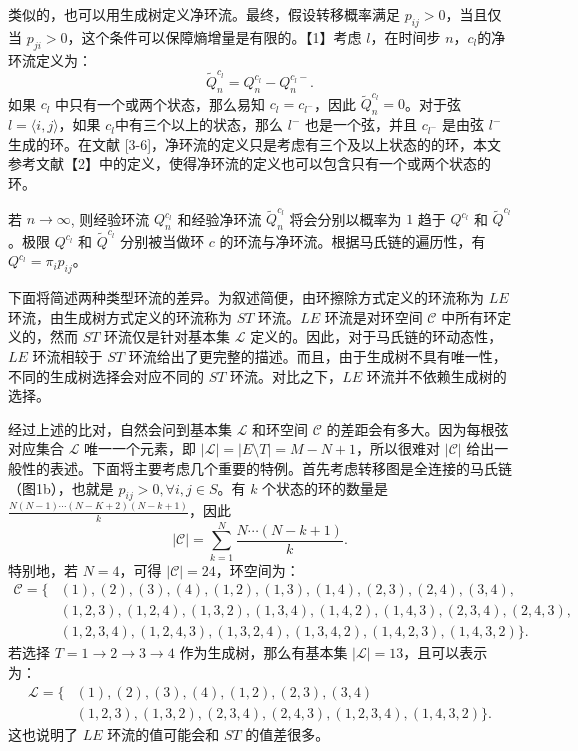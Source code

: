 类似的，也可以用生成树定义净环流。最终，假设转移概率满足 $p_{ij}>0$，当且仅当 $p_{ji}>0$，这个条件可以保障熵增量是有限的。【1】考虑 $l
$，在时间步 $n$，$c_l$的净环流定义为：
\begin{equation*}
    \tilde{Q}^{c_l}_n=Q^{c_l}_n-Q^{c_l-}_n.
\end{equation*}
如果 $c_l$ 中只有一个或两个状态，那么易知 $c_l = c_{l^-}$，因此 $\tilde{Q}_n^{c_l}=0$。对于弦 $l=\langle i,j \rangle$，如果 $c_l$中有三个以上的状态，那么 $l^-$ 也是一个弦，并且 $c_{l^-}$ 是由弦 $l^-$ 生成的环。在文献 [3-6]，净环流的定义只是考虑有三个及以上状态的的环，本文参考文献【2】中的定义，使得净环流的定义也可以包含只有一个或两个状态的环。

若 $n \to \infty$, 则经验环流 $Q_n^{c_l}$ 和经验净环流 $\tilde{Q}_n^{c_l}$ 将会分别以概率为 $1$ 趋于 $Q^{c_l}$ 和 $\tilde{Q}^{c_l}$。极限 $Q^{c_l}$ 和 $\tilde{Q}^{c_l}$ 分别被当做环 $c$ 的环流与净环流。根据马氏链的遍历性，有 $Q^{c_l} = \pi_i p_{ij}$。

下面将简述两种类型环流的差异。为叙述简便，由环擦除方式定义的环流称为 $LE$ 环流，由生成树方式定义的环流称为 $ST$ 环流。$LE$ 环流是对环空间 $\mathcal{C}$ 中所有环定义的，然而 $ST$ 环流仅是针对基本集 $\mathcal{L}$ 定义的。因此，对于马氏链的环动态性，$LE$ 环流相较于 $ST$ 环流给出了更完整的描述。而且，由于生成树不具有唯一性，不同的生成树选择会对应不同的 $ST$ 环流。对比之下，$LE$ 环流并不依赖生成树的选择。

经过上述的比对，自然会问到基本集 $\mathcal{L}$ 和环空间 $\mathcal{C}$ 的差距会有多大。因为每根弦对应集合 $\mathcal{L}$ 唯一一个元素，即 $|\mathcal{L}| = |E\setminus T| = M-N+1$，所以很难对 $|\mathcal{C}|$ 给出一般性的表述。下面将主要考虑几个重要的特例。首先考虑转移图是全连接的马氏链（图1b），也就是 $p_{ij}>0, \forall i,j \in S$。有 $k$ 个状态的环的数量是 $\frac{N (N-1) \cdots (N-K+2)(N-k+1)}{k}$，因此
\begin{equation*}
    |\mathcal{C}| = \sum_{k=1}^N\frac{N\cdots (N-k+1)}{k}.
\end{equation*}
特别地，若 $N=4$，可得 $|\mathcal{C}|=24$，环空间为：
\begin{align*}
    \mathcal{C} = \{&(1),(2),(3),(4),(1,2),(1,3),(1,4),(2,3),(2,4),(3,4),\\
    &(1,2,3),(1,2,4),(1,3,2),(1,3,4),(1,4,2),(1,4,3),(2,3,4),(2,4,3),\\
    &(1,2,3,4),(1,2,4,3),(1,3,2,4),(1,3,4,2),(1,4,2,3),(1,4,3,2)\}.
\end{align*}
若选择  $T = 1\to 2\to 3\to 4$ 作为生成树，那么有基本集 $|\mathcal{L}|=13$，且可以表示为：
\begin{align*}
    \mathcal{L} = \{&(1),(2),(3),(4),(1,2),(2,3),(3,4)\\
    &(1,2,3),(1,3,2),(2,3,4),(2,4,3),(1,2,3,4),(1,4,3,2)\}.
\end{align*}
这也说明了 $LE$ 环流的值可能会和 $ST$ 的值差很多。

